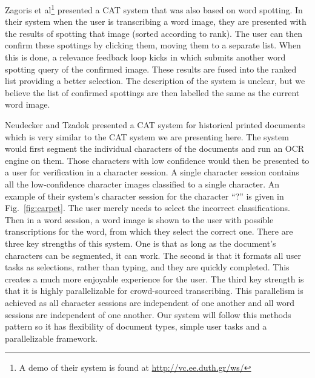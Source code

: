 \documentclass[ms]{byuprop}
\begin{document}
Zagoris et al\cite{Zagoris2015}\footnote{A demo of their system is found at \url{http://vc.ee.duth.gr/ws/}} presented a CAT system that was also based on word spotting. In their system when the user is transcribing a word image, they are presented with the results of spotting that image (sorted according to rank). The user can then confirm these spottings by clicking them, moving them to a separate list. When this is done, a relevance feedback loop kicks in which submits another word spotting query of the confirmed image. These results are fused into the ranked list providing a better selection. The description of the system is unclear, but we believe the list of confirmed spottings are then labelled the same as the current word image.

Neudecker and Tzadok\cite{Neudecker2010} presented a CAT system for historical printed documents which is very similar to the CAT system we are presenting here. The system would first segment the individual characters of the documents and run an OCR engine on them. Those characters with low confidence would then be presented to a user for verification in a character session. A single character session contains all the low-confidence character images classified to a single character. An example of their system's character session for the character ``?'' is given in Fig.~\ref{fig:carpet}.  The user merely needs to select the incorrect classifications. Then in a word session, a word image is shown to the user with possible transcriptions for the word, from which they select the correct one. There are three key strengths of this system. One is that as long as the document’s characters can be segmented, it can work. The second is that it formats all user tasks as selections, rather than typing, and they are quickly completed. This creates a much more enjoyable experience for the user. The third key strength is that it is highly parallelizable for crowd-sourced transcribing. This parallelism is achieved as all character sessions are independent of one another and all word sessions are independent of one another. Our system will follow this methods pattern so it has flexibility of document types, simple user tasks and a parallelizable framework.
\end{document}
